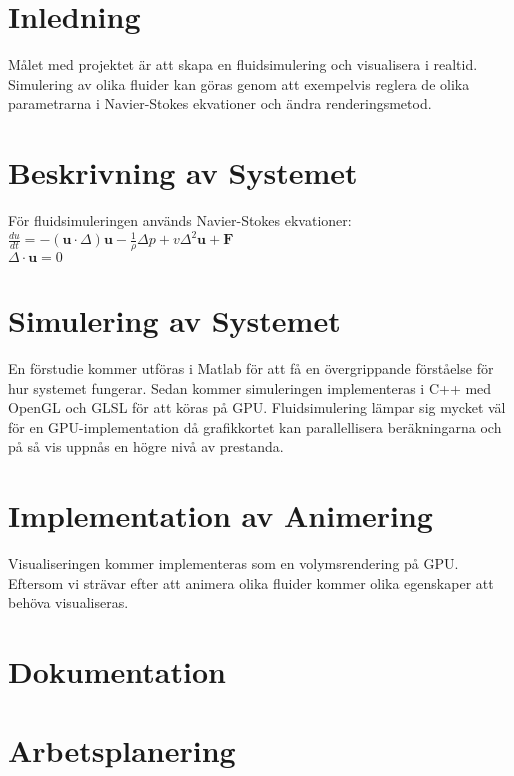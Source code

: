 \documentclass[a4paper,12pt,twoside,swedish]{report}
\begin{document}
\pagestyle{plain}

\setcounter{page}{1}

\section{Inledning}
Målet med projektet är att skapa en fluidsimulering och visualisera i realtid. Simulering av olika fluider kan göras genom att exempelvis reglera de olika parametrarna i Navier-Stokes ekvationer och ändra renderingsmetod. 

\section{Beskrivning av Systemet}
För fluidsimuleringen används Navier-Stokes ekvationer:\\
\(\frac{du}{dt} = - (\textbf{u}\cdot{\Delta})\textbf{u} - \frac{1}{\rho}\Delta p + v \Delta^2 \textbf{u} + \textbf{F}\) \\
\(\Delta \cdot \textbf{u} = 0 \) \\

\section{Simulering av Systemet}
En förstudie kommer utföras i Matlab för att få en övergrippande förståelse för hur systemet fungerar. Sedan kommer simuleringen implementeras i C++ med OpenGL och GLSL för att köras på GPU. Fluidsimulering lämpar sig mycket väl för en GPU-implementation då grafikkortet kan parallellisera beräkningarna och på så vis uppnås en högre nivå av prestanda. 
 
\section{Implementation av Animering}
Visualiseringen kommer implementeras som en volymsrendering på GPU. Eftersom vi strävar efter att animera olika fluider kommer olika egenskaper att behöva visualiseras.

\section{Dokumentation}

\section{Arbetsplanering}
	
\end{document}
